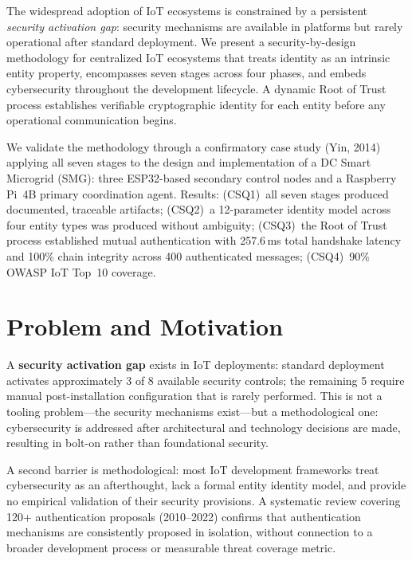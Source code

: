 \documentclass[12pt,a4paper]{article}
\begin{document}
The widespread adoption of IoT ecosystems is constrained by a persistent \emph{security activation gap}: security mechanisms are available in platforms but rarely operational after standard deployment. We present a security-by-design methodology for centralized IoT ecosystems that treats identity as an intrinsic entity property, encompasses seven stages across four phases, and embeds cybersecurity throughout the development lifecycle. A dynamic Root of Trust process establishes verifiable cryptographic identity for each entity before any operational communication begins.

We validate the methodology through a confirmatory case study (Yin, 2014) applying all seven stages to the design and implementation of a DC Smart Microgrid (SMG): three ESP32-based secondary control nodes and a Raspberry Pi~4B primary coordination agent. Results: (CSQ1)~all seven stages produced documented, traceable artifacts; (CSQ2)~a 12-parameter identity model across four entity types was produced without ambiguity; (CSQ3)~the Root of Trust process established mutual authentication with 257.6\,ms total handshake latency and 100\% chain integrity across 400 authenticated messages; (CSQ4)~90\% OWASP IoT Top~10 coverage.

\section{Problem and Motivation}
\label{sec:motivation}

A \textbf{security activation gap} exists in IoT deployments: standard deployment activates approximately 3 of 8 available security controls; the remaining 5 require manual post-installation configuration that is rarely performed. This is not a tooling problem---the security mechanisms exist---but a methodological one: cybersecurity is addressed after architectural and technology decisions are made, resulting in bolt-on rather than foundational security.

A second barrier is methodological: most IoT development frameworks treat cybersecurity as an afterthought, lack a formal entity identity model, and provide no empirical validation of their security provisions. A systematic review covering 120+ authentication proposals (2010--2022) confirms that authentication mechanisms are consistently proposed in isolation, without connection to a broader development process or measurable threat coverage metric.
\end{document}
